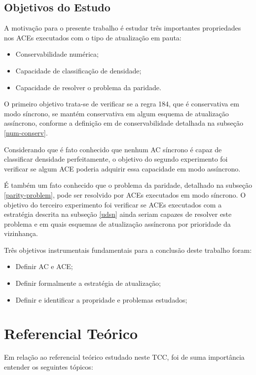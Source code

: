 \documentclass[a4paper,12pt]{ltxdoc}
\newcommand\tab[1][1cm]{\hspace*{#1}}
\begin{document}

\subsection{Objetivos do Estudo} 

A motivação para o presente trabalho é estudar três importantes propriedades nos ACEs executados com o tipo de atualização em pauta: 

\begin{itemize}
  \item Conservabilidade numérica;
  \item Capacidade de classificação de densidade;
  \item Capacidade de resolver o problema da paridade.
\end{itemize}

\tab O primeiro objetivo trata-se de verificar se a regra 184, que é conservativa em modo síncrono, se mantém conservativa em algum esquema de atualização assíncrono, conforme a definição em de conservabilidade detalhada na subseção \ref{num-conserv}. 

\tab Considerando que é fato conhecido que nenhum AC síncrono é capaz de classificar densidade perfeitamente, o objetivo do segundo experimento foi verificar se algum ACE poderia adquirir essa capacidade em modo assíncrono.

\tab É também um fato conhecido que o problema da paridade, detalhado na subseção \ref{parity-problem}, pode ser resolvido por ACEs executados em modo síncrono. O objetivo do terceiro experimento foi verificar se ACEs executados com a estratégia descrita na subseção \ref{udsn} ainda seriam capazes de resolver este problema e em quais esquemas de atualização assíncrona por prioridade da vizinhança.

\tab Três objetivos instrumentais fundamentais para a conclusão deste trabalho foram:

\begin{itemize}
  \item Definir AC e ACE;
  \item Definir formalmente a estratégia de atualização;
  \item Definir e identificar a propridade e problemas estudados;
\end{itemize}

\section{Referencial Teórico} \label{referencial}
Em relação ao referencial teórico estudado neste TCC, foi de suma importância entender os seguintes tópicos:
\end{document}
